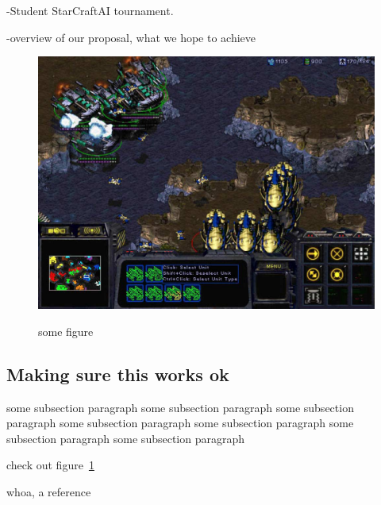 -Student StarCraftAI tournament.

-overview of our proposal, what we hope to achieve

\begin{figure}
\centering
\includegraphics[scale=0.4, trim = 0cm 0cm 0cm 0cm]{images/test}
\label{fig:test}
\caption{some figure}
\end{figure}

\subsection{Making sure this works ok}

some subsection paragraph some subsection paragraph some subsection paragraph some subsection paragraph some subsection paragraph some subsection paragraph some subsection paragraph

check out figure~\ref{fig:test}

whoa, a reference~\cite{gershenfeld1999nature}